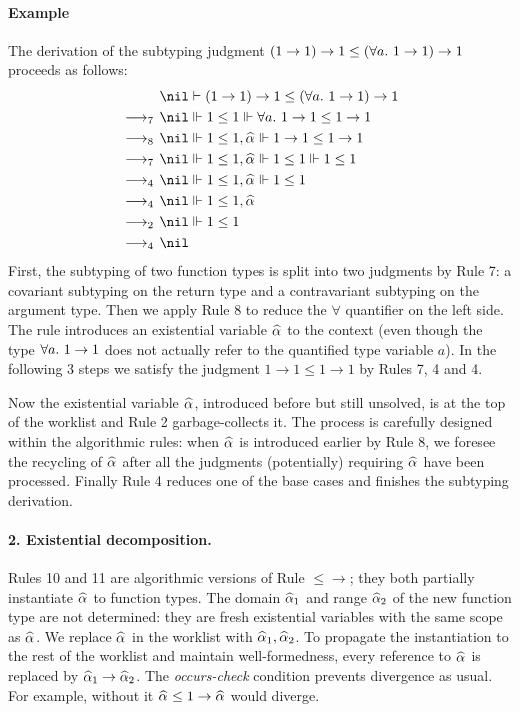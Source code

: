 \paragraph{Example} The derivation of the subtyping judgment
$(1\to 1)\to 1 \le (\all 1\to 1) \to 1$ proceeds as follows:
\begin{gather*}
\begin{aligned}
  & \nil\vdash (1\to 1)\to 1 \le (\all 1 \to 1) \to 1\\
\rrule{7}  & \nil \Vdash 1 \le 1 \Vdash \all 1 \to 1 \le 1 \to 1\\
\rrule{8}  & \nil \Vdash 1 \le 1 ,\al \Vdash 1 \to 1 \le 1 \to 1\\
\rrule{7}  & \nil \Vdash 1 \le 1 ,\al \Vdash 1 \le 1 \Vdash 1 \le 1\\
\rrule{4} & \nil \Vdash 1 \le 1 ,\al \Vdash 1 \le 1\\
\rrule{4} & \nil \Vdash 1 \le 1 ,\al\\
\rrule{2} & \nil \Vdash 1 \le 1\\
\rrule{4} & \nil
\end{aligned}
\end{gather*}
First, the subtyping of two function types is split into two judgments by Rule 7:
a covariant subtyping on the return type and a contravariant subtyping on the argument type.
Then we apply Rule 8 to reduce the $\forall$ quantifier on the left side.
The rule introduces an existential variable $\al$ to the context (even though 
the type $\all 1 \to 1$ does not actually refer to the quantified type
variable $a$).
In the following 3 steps we satisfy the judgment $1 \to 1 \le 1 \to 1$ by Rules 7, 4 and 4.

Now the existential variable $\al$, introduced before but still unsolved,
is at the top of the worklist and Rule 2 garbage-collects it.
The process is carefully designed within the algorithmic rules:
when $\al$ is introduced earlier by Rule 8,
we foresee the recycling of $\al$ after all the judgments (potentially)
requiring $\al$ have been processed.
Finally Rule 4 reduces one of the base cases and finishes the subtyping derivation.

\paragraph{\bf 2. Existential decomposition.}
Rules 10 and 11 are algorithmic versions of Rule $\mathtt{{\le}{\to}}$; they
both partially instantiate $\al$ to function types.
The domain $\al[1]$ and range $\al[2]$ of the new function type are not determined:
they are fresh existential variables with the same scope as $\al$.
We replace $\al$ in the worklist with  $\al[1], \al[2]$.
To propagate the instantiation to the rest of the worklist and maintain well-formedness,
every reference to $\al$ is replaced by $\al[1] \to \al[2]$.
The \emph{occurs-check} condition prevents divergence as usual.
For example, without it $\al \le 1 \to \al$ would diverge.

